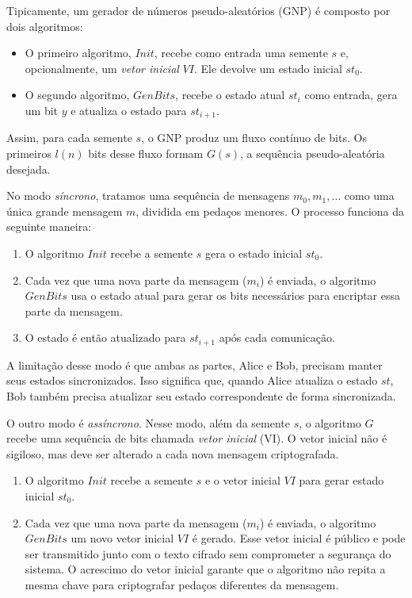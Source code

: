 Tipicamente, um gerador de números pseudo-aleatórios (GNP) é composto por dois algoritmos: 
\begin{itemize}
\item O primeiro algoritmo, $Init$, recebe como entrada uma semente $s$ e, opcionalmente, um {\em vetor inicial} $VI$.
  Ele devolve um estado inicial $st_0$.
\item  O segundo algoritmo, $GenBits$, recebe o estado atual $st_i$ como entrada, gera um bit $y$ e atualiza o estado para $st_{i+1}$.
\end{itemize}

Assim, para cada semente $s$, o GNP produz um fluxo contínuo de bits.
Os primeiros $l(n)$ bits desse fluxo formam $G(s)$, a sequência pseudo-aleatória desejada.

No modo \textit{síncrono}, tratamos uma sequência de mensagens $m_0, m_1, \dots$ como uma única grande mensagem $m$, dividida em pedaços menores.
O processo funciona da seguinte maneira:

\begin{enumerate}
    \item O algoritmo $Init$ recebe a semente $s$ gera o estado inicial $st_0$.
    \item Cada vez que uma nova parte da mensagem ($m_i$) é enviada, o algoritmo $GenBits$ usa o estado atual para gerar os bits necessários para encriptar essa parte da mensagem.
    \item O estado é então atualizado para $st_{i+1}$ após cada comunicação.
\end{enumerate}

A limitação desse modo é que ambas as partes, Alice e Bob, precisam manter seus estados sincronizados.
Isso significa que, quando Alice atualiza o estado $st$, Bob também precisa atualizar seu estado correspondente de forma sincronizada.

O outro modo é {\em assíncrono}.
Nesse modo, além da semente $s$, o algoritmo $G$ recebe uma sequência de bits chamada {\em vetor inicial} (VI).
O vetor inicial não é sigiloso, mas deve ser alterado a cada nova mensagem criptografada.

\begin{enumerate}
    \item O algoritmo $Init$ recebe a semente $s$ e o vetor inicial $VI$ para gerar estado inicial $st_0$.
    \item Cada vez que uma nova parte da mensagem ($m_i$) é enviada, o algoritmo $GenBits$ um novo vetor inicial $VI$ é gerado.
      Esse vetor inicial é público e pode ser transmitido junto com o texto cifrado sem comprometer a segurança do sistema.
      O acrescimo do vetor inicial garante que o algoritmo não repita a mesma chave para criptografar pedaços diferentes da mensagem.
\end{enumerate}

